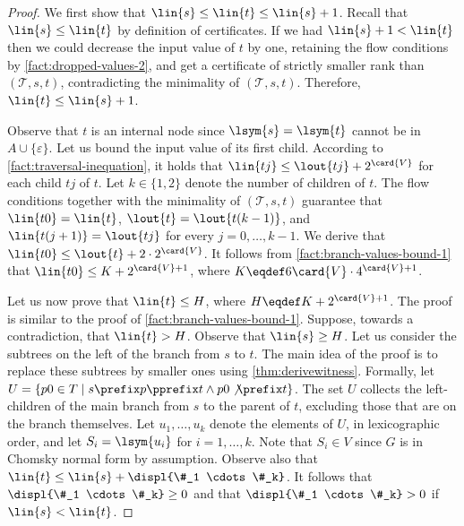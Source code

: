 \FactBranchValuesBoundThree*
\begin{proof}
  We first show that $\lin{s} \leq \lin{t} \leq \lin{s} + 1$.
  Recall that $\lin{s} \leq \lin{t}$ by definition of certificates.
  If we had $\lin{s} + 1 < \lin{t}$ then we could
  decrease the input value of $t$ by one,
  retaining the flow conditions by \cref{fact:dropped-values-2},
  and get a certificate
  of strictly smaller rank than $(\mathcal{T}, s, t)$,
  contradicting the minimality of $(\mathcal{T}, s, t)$.
  Therefore, $\lin{t} \leq \lin{s} + 1$.

  Observe that $t$ is an internal node since $\lsym{s} = \lsym{t}$
  cannot be in $A \cup \{\varepsilon\}$.
  Let us bound the input value of its first child.
  According to \cref{fact:traversal-inequation},
  it holds that $\lin{tj} \leq \lout{tj} + 2^{\card{V}}$
  for each child $tj$ of $t$.
  Let $k \in \{1, 2\}$ denote the number of children of $t$.
  The flow conditions together with
  the minimality of $(\mathcal{T}, s, t)$ guarantee that
  $\lin{t0} = \lin{t}$,
  $\lout{t} = \lout{t(k-1)}$, and
  $\lin{t(j+1)} = \lout{tj}$ for every $j = 0, \ldots, k-1$.
  We derive that $\lin{t0} \leq \lout{t} + 2 \cdot 2^{\card{V}}$.
  It follows from \cref{fact:branch-values-bound-1} that
  $\lin{t0} \leq K + 2^{\card{V} + 1}$,
  where $K \eqdef 6 \card{V} \cdot 4^{\card{V}+1}$.

  Let us now prove that $\lin{t} \leq H$,
  where $H \eqdef K + 2^{\card{V} + 1}$.
  The proof is similar to the proof of \cref{fact:branch-values-bound-1}.
  Suppose, towards a contradiction, that $\lin{t} > H$.
  Observe that $\lin{s} \geq H$.
  Let us consider the subtrees on the left of the branch from $s$ to $t$.
  The main idea of the proof is to replace these subtrees by smaller ones
  using \cref{thm:derivewitness}.
  Formally,
  let $U = \{p0 \in T \mid s \prefix p \pprefix t \wedge p0 \not\prefix t\}$.
  The set $U$ collects the left-children of the main branch from $s$ to the parent of $t$,
  excluding those that are on the branch themselves.
  Let $u_1, \ldots, u_k$ denote the elements of $U$,
  in lexicographic order,
  and let $S_i = \lsym{u_i}$ for $i = 1, \ldots, k$.
  Note that $S_i \in V$ since $G$ is in Chomsky normal form by assumption.
  Observe also that $\lin{t} \leq \lin{s} + \displ{\#_1 \cdots \#_k}$.
  It follows that
  $\displ{\#_1 \cdots \#_k} \geq 0$ and that
  $\displ{\#_1 \cdots \#_k} > 0$ if $\lin{s} < \lin{t}$.


\end{proof}
